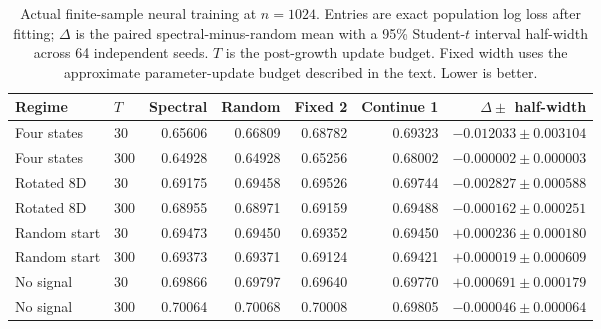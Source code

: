 \begin{table}[tb]
\centering\footnotesize\setlength{\tabcolsep}{4pt}
\caption{Actual finite-sample neural training at $n=1024$. Entries are exact population log loss after fitting; $\Delta$ is the paired spectral-minus-random mean with a 95\% Student-$t$ interval half-width across 64 independent seeds. $T$ is the post-growth update budget. Fixed width uses the approximate parameter-update budget described in the text. Lower is better.}
\label{tab:neural-results}
\begin{tabular}{@{}llrrrrr@{}}
\toprule
Regime & $T$ & Spectral & Random & Fixed 2 & Continue 1 & $\Delta\pm$ half-width\\
\midrule
Four states & 30 & 0.65606 & 0.66809 & 0.68782 & 0.69323 & $-0.012033 \pm 0.003104$ \\
Four states & 300 & 0.64928 & 0.64928 & 0.65256 & 0.68002 & $-0.000002 \pm 0.000003$ \\
Rotated 8D & 30 & 0.69175 & 0.69458 & 0.69526 & 0.69744 & $-0.002827 \pm 0.000588$ \\
Rotated 8D & 300 & 0.68955 & 0.68971 & 0.69159 & 0.69488 & $-0.000162 \pm 0.000251$ \\
Random start & 30 & 0.69473 & 0.69450 & 0.69352 & 0.69450 & $+0.000236 \pm 0.000180$ \\
Random start & 300 & 0.69373 & 0.69371 & 0.69124 & 0.69421 & $+0.000019 \pm 0.000609$ \\
No signal & 30 & 0.69866 & 0.69797 & 0.69640 & 0.69770 & $+0.000691 \pm 0.000179$ \\
No signal & 300 & 0.70064 & 0.70068 & 0.70008 & 0.69805 & $-0.000046 \pm 0.000064$ \\
\bottomrule
\end{tabular}
\end{table}
